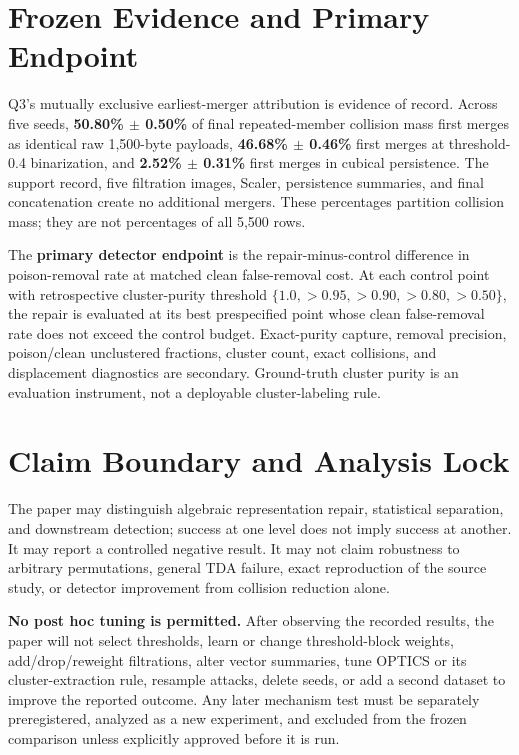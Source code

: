 \documentclass[conference]{IEEEtran}
\begin{document}
\section*{Frozen Evidence and Primary Endpoint}
Q3's mutually exclusive earliest-merger attribution is evidence of record.
Across five seeds, \textbf{50.80\% $\pm$ 0.50\%} of final repeated-member
collision mass first merges as identical raw 1,500-byte payloads,
\textbf{46.68\% $\pm$ 0.46\%} first merges at threshold-0.4 binarization, and
\textbf{2.52\% $\pm$ 0.31\%} first merges in cubical persistence. The support
record, five filtration images, Scaler, persistence summaries, and final
concatenation create no additional mergers. These percentages partition
collision mass; they are not percentages of all 5,500 rows.

The \textbf{primary detector endpoint} is the repair-minus-control difference
in poison-removal rate at matched clean false-removal cost. At each control
point with retrospective cluster-purity threshold
\(\{1.0,>0.95,>0.90,>0.80,>0.50\}\), the repair is evaluated at its best
prespecified point whose clean false-removal rate does not exceed the control
budget. Exact-purity capture, removal precision, poison/clean unclustered
fractions, cluster count, exact collisions, and displacement diagnostics are
secondary. Ground-truth cluster purity is an evaluation instrument, not a
deployable cluster-labeling rule.

\section*{Claim Boundary and Analysis Lock}
The paper may distinguish algebraic representation repair, statistical
separation, and downstream detection; success at one level does not imply
success at another. It may report a controlled negative result. It may not
claim robustness to arbitrary permutations, general TDA failure, exact
reproduction of the source study, or detector improvement from collision
reduction alone.

\textbf{No post hoc tuning is permitted.} After observing the recorded results,
the paper will not select thresholds, learn or change threshold-block weights,
add/drop/reweight filtrations, alter vector summaries, tune OPTICS or its
cluster-extraction rule, resample attacks, delete seeds, or add a second dataset
to improve the reported outcome. Any later mechanism test must be separately
preregistered, analyzed as a new experiment, and excluded from the frozen
comparison unless explicitly approved before it is run.
\end{document}
